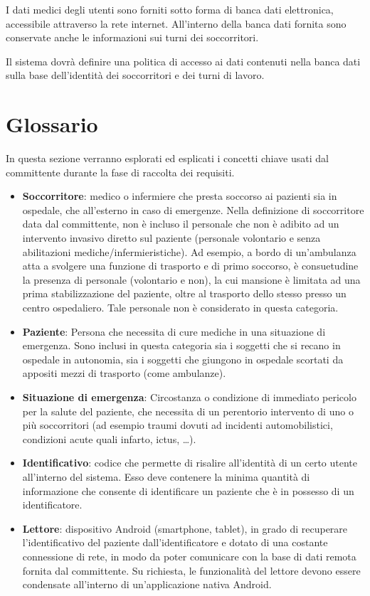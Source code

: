 \documentclass[a4paper,12pt]{report}
\begin{document}
I dati medici degli utenti sono forniti sotto forma di banca dati elettronica, accessibile attraverso la rete internet. All'interno della banca dati fornita sono conservate anche le informazioni sui turni dei soccorritori. 

Il sistema dovrà definire una politica di accesso ai dati contenuti nella banca dati sulla base dell'identità dei soccorritori e dei turni di lavoro. 

\section{Glossario} \label{glossary}
In questa sezione verranno esplorati ed esplicati i concetti chiave usati dal committente durante la fase di raccolta dei requisiti. 
\begin{itemize}
	\item \textbf{Soccorritore}: medico o infermiere che presta soccorso ai pazienti sia in ospedale, che all'esterno in caso di emergenze. Nella definizione di soccorritore data dal committente, non è incluso il personale che non è adibito ad un intervento invasivo diretto sul paziente (personale volontario e senza abilitazioni mediche/infermieristiche). Ad esempio, a bordo di un'ambulanza atta a svolgere una funzione di trasporto e di primo soccorso, è consuetudine la presenza di personale (volontario e non), la cui mansione è limitata ad una prima stabilizzazione del paziente, oltre al trasporto dello stesso presso un centro ospedaliero. Tale personale non è considerato in questa categoria.
	\item \textbf{Paziente}: Persona che necessita di cure mediche in una situazione di emergenza. Sono inclusi in questa categoria sia i soggetti che si recano in ospedale in autonomia, sia i soggetti che giungono in ospedale scortati da appositi mezzi di trasporto (come ambulanze).
	\item \textbf{Situazione di emergenza}: Circostanza o condizione di immediato pericolo per la salute del paziente, che necessita di un perentorio intervento di uno o più soccorritori (ad esempio traumi dovuti ad incidenti automobilistici, condizioni acute quali infarto, ictus, \dots).
	\item \textbf{Identificativo}: codice che permette di risalire all'identità di un certo utente all'interno del sistema. Esso deve contenere la minima quantità di informazione che consente di identificare un paziente che è in possesso di un identificatore.
	\item \textbf{Lettore}: dispositivo Android (smartphone, tablet), in grado di recuperare l'identificativo del paziente dall'identificatore e dotato di una costante connessione di rete, in modo da poter comunicare con la base di dati remota fornita dal committente. Su richiesta, le funzionalità del lettore devono essere condensate all'interno di un'applicazione nativa Android.

\end{itemize}
\end{document}
